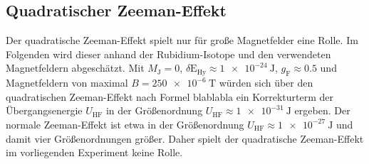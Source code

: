 \subsection{Quadratischer Zeeman-Effekt}
Der quadratische Zeeman-Effekt spielt nur für große Magnetfelder eine Rolle. Im Folgenden wird dieser anhand der Rubidium-Isotope und den verwendeten Magnetfeldern abgeschätzt.
Mit $M_{\mathrm{J}}=0$, $\delta \mathrm{E_{Hy}}\approx\SI{1e-24}{\joule}$, $g_{\mathrm{F}}\approx 0.5$ und Magnetfeldern von maximal $B=\SI{250e-6}{\tesla}$ würden sich über den quadratischen Zeeman-Effekt nach Formel blablabla ein Korrekturterm der Übergangsenergie $U_{\mathrm{HF}}$ in der Größenordnung $U_{\mathrm{HF}}\approx \SI{1e-31}{\joule}$ ergeben. Der normale Zeeman-Effekt ist etwa in der Größenordnung $U_{\mathrm{HF}}\approx \SI{1e-27}{\joule}$ und damit vier Größenordnungen größer. Daher spielt der quadratische Zeeman-Effekt im vorliegenden Experiment keine Rolle.
